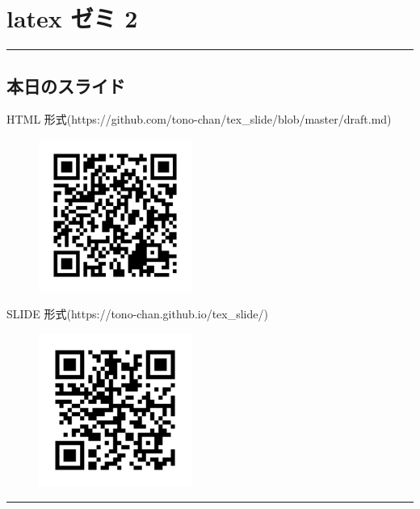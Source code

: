 \hypertarget{latex-ux30bcux30df-2}{\section{latex ゼミ
2}\label{latex-ux30bcux30df-2}}

\begin{center}\rule{0.5\linewidth}{\linethickness}\end{center}

\hypertarget{ux672cux65e5ux306eux30b9ux30e9ux30a4ux30c9}{\subsection{本日のスライド}\label{ux672cux65e5ux306eux30b9ux30e9ux30a4ux30c9}}

HTML 形式(https://github.com/tono-chan/tex\_slide/blob/master/draft.md)

\begin{figure}[htbp]
\centering
\includegraphics[width=5.00000cm]{./figures/markdown_url.png}
\caption{}
\end{figure}

SLIDE 形式(https://tono-chan.github.io/tex\_slide/)

\begin{figure}[htbp]
\centering
\includegraphics[width=5.00000cm]{./figures/slide_url.png}
\caption{}
\end{figure}

\begin{center}\rule{0.5\linewidth}{\linethickness}\end{center}

